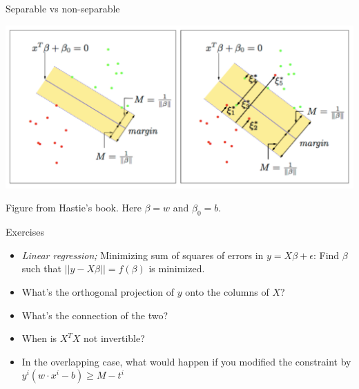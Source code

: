 \documentclass{beamer}
\begin{document}

\begin{frame}{Separable vs non-separable}

\includegraphics[scale=0.42]{figures/margin.png}

\caption{   Figure from Hastie's book. Here $\beta = w$ and $\beta_0 = b$.}

\end{frame}


\begin{frame}{Exercises}
\begin{itemize}
    \item \textit{Linear regression;} Minimizing sum of squares of errors in $y=X\beta + \epsilon$:  Find $\beta$ such that $||y-X\beta||=f(\beta)$ is minimized.
    \item What's the orthogonal projection of $y$ onto the columns of $X$?
    \item What's the connection of the two?
    \item When is $X^TX$ not invertible?
    \item In the overlapping case, what would happen if you modified the constraint by $y^i(w\cdot x^i - b) \geq M - t^i$
\end{itemize}
\end{frame}

\end{document}
